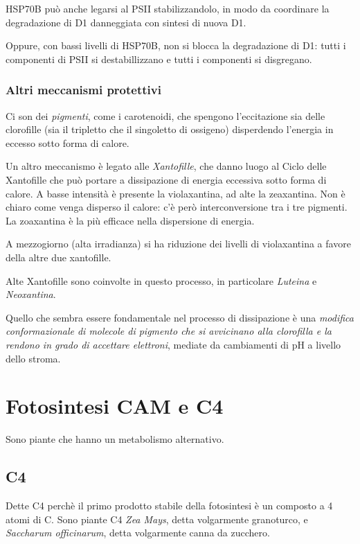\documentclass[a4paper,12pt]{book}
\begin{document}
HSP70B può anche legarsi al PSII stabilizzandolo, in modo da coordinare la degradazione di D1 danneggiata con sintesi di nuova D1.

Oppure, con bassi livelli di HSP70B, non si blocca la degradazione di D1: tutti i componenti di PSII si destabillizzano e tutti i componenti si disgregano.

\subsection{Altri meccanismi protettivi}
 
Ci son dei \emph{pigmenti}, come i carotenoidi, che spengono l'eccitazione sia delle clorofille (sia il tripletto che il singoletto di ossigeno) disperdendo l'energia in eccesso sotto forma di calore.

Un altro meccanismo è legato alle \emph{Xantofille}, che danno luogo al Ciclo delle Xantofille che può portare a dissipazione di energia eccessiva sotto forma di calore. A basse intensità è presente la violaxantina,  ad alte la zeaxantina. Non è chiaro come venga disperso il calore: c'è però interconversione tra i tre pigmenti. La zoaxantina è la più efficace nella dispersione di energia.

A mezzogiorno (alta irradianza) si ha riduzione dei livelli di violaxantina a favore della altre due xantofille.

Alte Xantofille sono coinvolte in questo processo, in particolare \emph{Luteina} e \emph{Neoxantina}.

Quello che sembra essere fondamentale nel processo di dissipazione è una \emph{modifica conformazionale di molecole di pigmento che si avvicinano alla clorofilla e la rendono in grado di accettare elettroni}, mediate da cambiamenti di pH a livello dello stroma.

\chapter{Fotosintesi CAM e C4}
Sono piante che hanno un metabolismo alternativo.
\section{C4}
Dette C4 perchè il primo prodotto stabile della fotosintesi è un composto a 4 atomi di C. Sono piante C4 \emph{Zea Mays}, detta volgarmente granoturco, e \emph{Saccharum officinarum}, detta volgarmente canna da zucchero.
\end{document}
